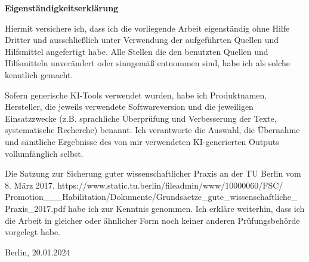 \newpage

\thispagestyle{empty}
\begin{large}
\noindent
\textbf{Eigenständigkeitserklärung}
\vspace*{1.5cm}

\noindent
Hiermit versichere ich, dass ich die vorliegende Arbeit eigenständig ohne Hilfe Dritter und ausschließlich unter
Verwendung der aufgeführten Quellen und Hilfsmittel angefertigt habe. Alle Stellen die den benutzten Quellen
und Hilfsmitteln unverändert oder sinngemäß entnommen sind, habe ich als solche kenntlich gemacht. 
\newline

\noindent
Sofern generische KI-Tools verwendet wurden, habe ich Produktnamen, Hersteller, die jeweils verwendete
Softwareversion und die jeweiligen Einsatzzwecke (z.B. sprachliche Überprüfung und Verbesserung der Texte,
systematische Recherche) benannt. Ich verantworte die Auswahl, die Übernahme und sämtliche Ergebnisse
des von mir verwendeten KI-generierten Outputs vollumfänglich selbst.
\newline

\noindent
Die Satzung zur Sicherung guter wissenschaftlicher Praxis an der TU Berlin vom 8. März 2017.
https://www.static.tu.berlin/fileadmin/www/10000060/FSC/ \\
Promotion\_\_\_Habilitation/Dokumente/Grundsaetze\_gute\_wissenschaftliche\_ \\
Praxis\_2017.pdf habe ich zur Kenntnis genommen.
Ich erkläre weiterhin, dass ich die Arbeit in gleicher oder ähnlicher Form noch keiner anderen Prüfungsbehörde
vorgelegt habe.
\vspace{2cm}

\noindent
Berlin, 20.01.2024\\ %

\vspace{3cm}

\hspace*{7cm}%
\dotfill\\
\hspace*{8.5cm}%

\end{large}